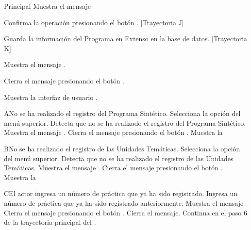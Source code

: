 \begin{UCtrayectoria}{Principal}
    \UCpaso Muestra el mensaje 

    \UCpaso[\UCactor] Confirma la operación presionando el botón . [Trayectoria J]
    
    \UCpaso Guarda la información del Programa en Extenso en la base de datos. [Trayectoria K]
    
    \UCpaso Muestra el mensaje .
    
    \UCpaso[\UCactor] Cierra el mensaje presionando el botón .
    
    \UCpaso Muestra la interfaz de usuario .
\end{UCtrayectoria}


\begin{UCtrayectoriaA}{A}{No se ha realizado el registro del Programa Sintético.}
    \UCpaso[\UCactor] Selecciona la opción  del menú superior.
    \UCpaso Detecta que no se ha realizado el registro del Programa Sintético.
        \UCpaso Muestra el mensaje .
    \UCpaso[\UCactor] Cierra el mensaje presionando el botón .
    \UCpaso Muestra la 
\end{UCtrayectoriaA}


\begin{UCtrayectoriaA}{B}{No se ha realizado el registro de las Unidades Temáticas.}
    \UCpaso[\UCactor] Selecciona la opción  del menú superior.
    \UCpaso Detecta que no se ha realizado el registro de las Unidades Temáticas.
        \UCpaso Muestra el mensaje .
    \UCpaso[\UCactor] Cierra el mensaje presionando el botón .
    \UCpaso Muestra la 
\end{UCtrayectoriaA}


\begin{UCtrayectoriaA}{C}{El actor ingresa un número de práctica que ya ha sido registrado.}
    \UCpaso[\UCactor] Ingresa un número de práctica que ya ha sido registrado anteriormente.
    \UCpaso Muestra el mensaje 
    \UCpaso[\UCactor] Cierra el mensaje presionando el botón .
    \UCpaso Cierra el mensaje. 
    \UCpaso Continua en el paso 6 de la trayectoria principal del .
\end{UCtrayectoriaA}

